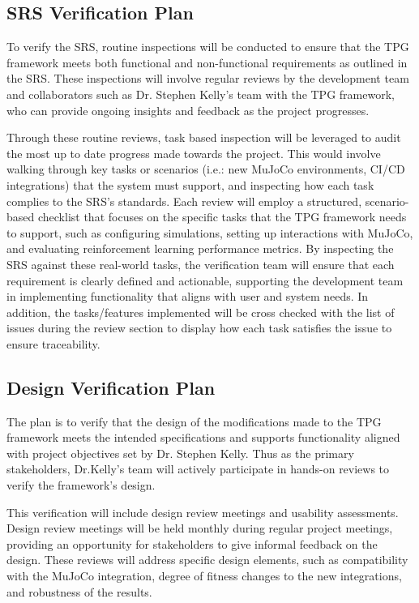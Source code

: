 \documentclass[12pt, titlepage]{article}
\begin{document}
\subsection{SRS Verification Plan}

To verify the SRS, routine inspections will be conducted to ensure that the TPG framework meets both functional and non-functional requirements as outlined in the SRS. These inspections will involve regular reviews by the development team and collaborators such as Dr. Stephen Kelly’s team with the TPG framework, who can provide ongoing insights and feedback as the project progresses. 

Through these routine reviews, task based inspection will be leveraged to audit the most up to date progress made towards the project. This would involve walking through key tasks or scenarios (i.e.: new MuJoCo environments, CI/CD integrations) that the system must support, and inspecting how each task complies to the SRS’s standards. Each review will employ a structured, scenario-based checklist that focuses on the specific tasks that the TPG framework needs to support, such as configuring simulations, setting up interactions with MuJoCo, and evaluating reinforcement learning performance metrics. By inspecting the SRS against these real-world tasks, the verification team will ensure that each requirement is clearly defined and actionable, supporting the development team in implementing functionality that aligns with user and system needs. In addition, the tasks/features implemented will be cross checked with the list of issues during the review section to display how each task satisfies the issue to ensure traceability.


\subsection{Design Verification Plan}

The plan is to verify that the design of the modifications made to the TPG framework meets the intended specifications and supports functionality aligned with project objectives set by Dr. Stephen Kelly. Thus as the primary stakeholders, Dr.Kelly's team will actively participate in hands-on reviews to verify the framework's design.

This verification will include design review meetings and usability assessments. Design review meetings will be held monthly during regular project meetings, providing an opportunity for stakeholders to give informal feedback on the design. These reviews will address specific design elements, such as compatibility with the MuJoCo integration, degree of fitness changes to the new integrations, and robustness of the results.
\end{document}

